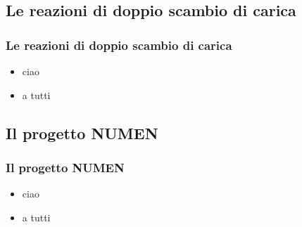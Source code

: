 \documentclass[pt12]{beamer}
\begin{document}
\subsection*{Le reazioni di doppio scambio di carica}
\begin{frame}
	\frametitle{Le reazioni di doppio scambio di carica}
    \begin{itemize}[<+->]
    	\item ciao
    	\item a tutti
    \end{itemize}
\end{frame}


\subsection*{Il progetto NUMEN}
\begin{frame}
	\frametitle{Il progetto NUMEN}
	\begin{itemize}[<+->]
		\item ciao
		\item a tutti
	\end{itemize}
\end{frame}


%
\end{document}
